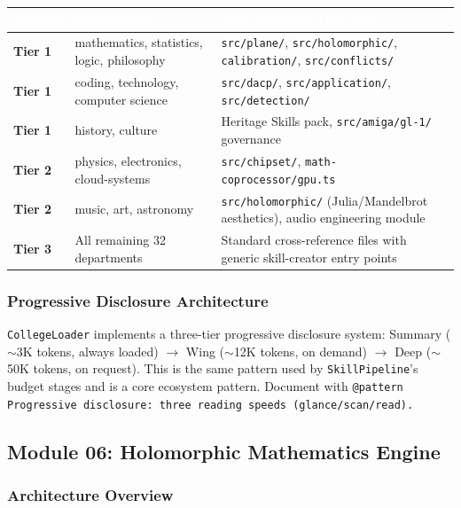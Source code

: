 \documentclass[11pt,letterpaper]{article}
\newcommand{\tableheader}[1]{\textbf{\sffamily\textcolor{white}{#1}}}
\begin{document}
\begin{center}
\begin{tabularx}{\textwidth}{L{2cm}L{3.5cm}X}
\toprule
{}
\tableheader{Priority} & \tableheader{Departments} & \tableheader{Code Modules That Link} \\
\midrule
\textbf{Tier 1} & mathematics, statistics, logic, philosophy & \texttt{src/plane/}, \texttt{src/holomorphic/}, \texttt{calibration/}, \texttt{src/conflicts/} \\
\textbf{Tier 1} & coding, technology, computer science & \texttt{src/dacp/}, \texttt{src/application/}, \texttt{src/detection/} \\
\textbf{Tier 1} & history, culture & Heritage Skills pack, \texttt{src/amiga/gl-1/} governance \\
\textbf{Tier 2} & physics, electronics, cloud-systems & \texttt{src/chipset/}, \texttt{math-coprocessor/gpu.ts} \\
\textbf{Tier 2} & music, art, astronomy & \texttt{src/holomorphic/} (Julia/Mandelbrot aesthetics), audio engineering module \\
\textbf{Tier 3} & All remaining 32 departments & Standard cross-reference files with generic skill-creator entry points \\
\bottomrule
\end{tabularx}
\end{center}

\subsubsection{Progressive Disclosure Architecture}

\texttt{CollegeLoader} implements a three-tier progressive disclosure system: Summary ($\sim$3K tokens, always loaded) $\to$ Wing ($\sim$12K tokens, on demand) $\to$ Deep ($\sim$50K tokens, on request). This is the same pattern used by \texttt{SkillPipeline}'s budget stages and is a core ecosystem pattern. Document with \texttt{@pattern Progressive disclosure: three reading speeds (glance/scan/read).}

\subsection{Module 06: Holomorphic Mathematics Engine}

\subsubsection{Architecture Overview}
\end{document}
